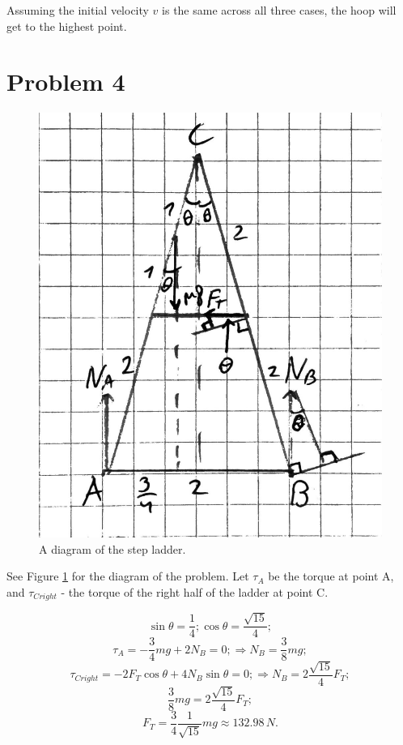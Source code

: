 \documentclass{article}
\begin{document}
Assuming the initial velocity $v$ is the same across all three cases, the hoop will get to the highest point.

\section*{Problem 4}
\begin{figure}
\includegraphics[scale=0.3]{p4fig1}
\centering
\caption{A diagram of the step ladder.}
\label{fig:diagram}
\end{figure}

See Figure \ref{fig:diagram} for the diagram of the problem. Let $\tau_A$ be the torque at point A, and $\tau_{Cright}$ - the torque of the right half of the ladder at point C.

\[
\sin{\theta} = \frac{1}{4}; \cos{\theta} = \frac{\sqrt{15}}{4};
\]
\[
\tau_A = -\frac{3}{4}mg + 2N_B = 0; \Rightarrow N_B = \frac{3}{8}mg;
\]
\[
\tau_{Cright} = -2F_T\cos{\theta} + 4N_B\sin{\theta} = 0; \Rightarrow N_B = 2\frac{\sqrt{15}}{4}F_T;
\]
\[
\frac{3}{8}mg = 2\frac{\sqrt{15}}{4}F_T;
\]
\[
F_T = \frac{3}{4}\frac{1}{\sqrt{15}}mg \approx 132.98\,N.
\]
\end{document}
